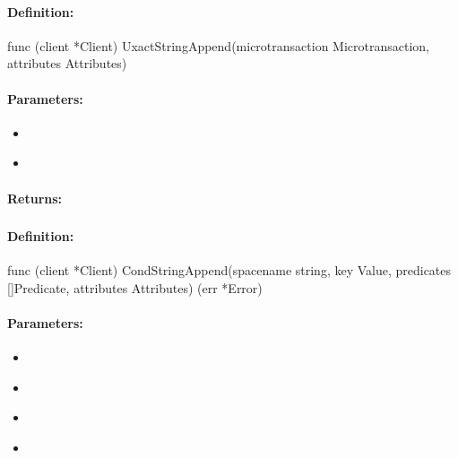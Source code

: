 \paragraph{Definition:}
\begin{gocode}
func (client *Client) UxactStringAppend(microtransaction Microtransaction, attributes Attributes)
\end{gocode}

\paragraph{Parameters:}
\begin{itemize}[noitemsep]
\item {}\\

\item {}\\

\end{itemize}

\paragraph{Returns:}


\pagebreak
\subsubsection{}
\label{api:Go:CondStringAppend}


\paragraph{Definition:}
\begin{gocode}
func (client *Client) CondStringAppend(spacename string, key Value, predicates []Predicate, attributes Attributes) (err *Error)
\end{gocode}

\paragraph{Parameters:}
\begin{itemize}[noitemsep]
\item {}\\

\item {}\\

\item {}\\

\item {}\\

\end{itemize}

